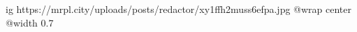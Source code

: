  
 
 
 
 

\ifcmt
  ig https://mrpl.city/uploads/posts/redactor/xy1ffh2muss6efpa.jpg
  @wrap center
  @width 0.7
\fi
